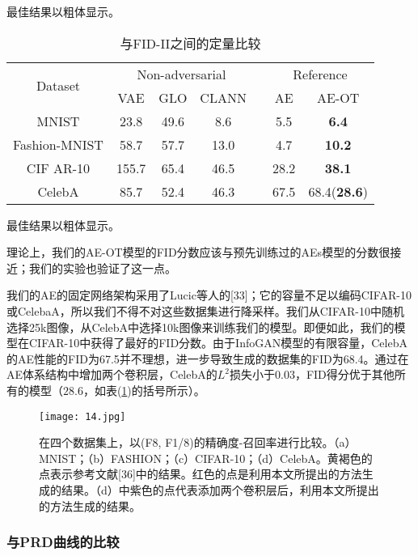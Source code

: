 最佳结果以粗体显示。

\begin{table}[!htbp]
	\caption{与FID-II之间的定量比较}
	\label{table:4}
	\centering
	\begin{tabular}{@{}ccccccc@{}}
		\cmidrule(r){1-7}
		\multirow{2}{*}{Dataset} & \multicolumn{3}{c}{Non-adversarial} &  & \multicolumn{2}{c}{Reference} \\ \cmidrule(lr){2-4} \cmidrule(l){6-7} 
		& VAE        & GLO       & CLANN      &  & AE        & AE-OT             \\ \cmidrule(r){1-7}
		MNIST                    & 23.8       & 49.6      & 8.6        &  & 5.5       & \textbf{6.4}      \\
		Fashion-MNIST            & 58.7       & 57.7      & 13.0       &  & 4.7       & \textbf{10.2}     \\
		CIF AR-10                & 155.7      & 65.4      & 46.5       &  & 28.2      & \textbf{38.1}     \\
		CelebA                   & 85.7       & 52.4      & 46.3       &  & 67.5      & 68.4(\textbf{28.6})        \\ \cmidrule(r){1-7}
	\end{tabular}
\end{table}

最佳结果以粗体显示。

理论上，我们的AE-OT模型的FID分数应该与预先训练过的AEs模型的分数很接近；我们的实验也验证了这一点。

我们的AE的固定网络架构采用了Lucic等人的[33]；它的容量不足以编码CIFAR-10或CelebaA，所以我们不得不对这些数据集进行降采样。我们从CIFAR-10中随机选择25k图像，从CelebA中选择10k图像来训练我们的模型。即便如此，我们的模型在CIFAR-10中获得了最好的FID分数。由于InfoGAN模型的有限容量，CelebA的AE性能的FID为67.5并不理想，进一步导致生成的数据集的FID为68.4。通过在AE体系结构中增加两个卷积层，CelebA的$L^2$损失小于$0.03$，FID得分优于其他所有的模型（$28.6$，如表(\ref{table:4})的括号所示）。

\begin{figure}[h]
	\centering
	\texttt{[image: 14.jpg]}
	\caption{在四个数据集上，以(F8, F1/8)的精确度-召回率进行比较。（a）MNIST；（b）FASHION；（c）CIFAR-10；（d）CelebA。黄褐色的点表示参考文献[36]中的结果。红色的点是利用本文所提出的方法生成的结果。（d）中紫色的点代表添加两个卷积层后，利用本文所提出的方法生成的结果。}
	\label{fig:14}
\end{figure}

\subsubsection{与PRD曲线的比较}

